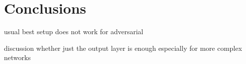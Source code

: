 \chapter{Conclusions}

usual best setup does not work for adversarial

discussion whether just the output layer is enough especially for more complex networks